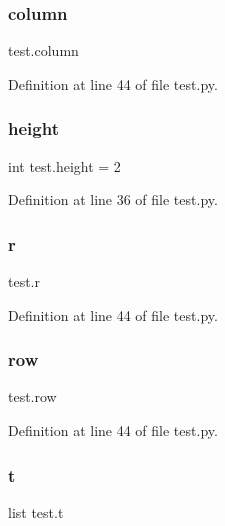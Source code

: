 \subsubsection{\texorpdfstring{column}{column}}
{\footnotesize\ttfamily test.\+column}



Definition at line 44 of file test.\+py.

\mbox{\label{namespacetest_a0981d504d028598d82644c006c420453}} 
\subsubsection{\texorpdfstring{height}{height}}
{\footnotesize\ttfamily int test.\+height = 2}



Definition at line 36 of file test.\+py.

\mbox{\label{namespacetest_ac1f92ca15306aee561188e0f37aabc66}} 
\subsubsection{\texorpdfstring{r}{r}}
{\footnotesize\ttfamily test.\+r}



Definition at line 44 of file test.\+py.

\mbox{\label{namespacetest_acd02555154e98da6e1aef05f9f04eeff}} 
\subsubsection{\texorpdfstring{row}{row}}
{\footnotesize\ttfamily test.\+row}



Definition at line 44 of file test.\+py.

\mbox{\label{namespacetest_a2c4aff22c8d480238b3dfd81a25b9b70}} 
\subsubsection{\texorpdfstring{t}{t}}
{\footnotesize\ttfamily list test.\+t}


